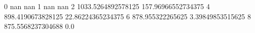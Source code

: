 0 nan nan
1 nan nan
2 1033.5264892578125 157.96966552734375
4 898.4190673828125 22.86224365234375
6 878.955322265625 3.39849853515625
8 875.5568237304688 0.0
